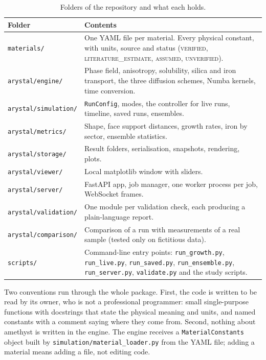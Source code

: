 \documentclass[11pt,a4paper]{article}
\newcommand{\code}[1]{\texttt{#1}}
\begin{document}
\begin{table}[ht]
\caption{Folders of the repository and what each holds.}\label{tab:folders}
\small
\begin{tabularx}{\textwidth}{@{}lX@{}}
\toprule
Folder & Contents \\
\midrule
\code{materials/} & One YAML file per material. Every physical constant, with units, source and status (\textsc{verified}, \textsc{literature\_estimate}, \textsc{assumed}, \textsc{unverified}). \\
\code{arystal/engine/} & Phase field, anisotropy, solubility, silica and iron transport, the three diffusion schemes, Numba kernels, time conversion. \\
\code{arystal/simulation/} & \code{RunConfig}, modes, the controller for live runs, timeline, saved runs, ensembles. \\
\code{arystal/metrics/} & Shape, face support distances, growth rates, iron by sector, ensemble statistics. \\
\code{arystal/storage/} & Result folders, serialisation, snapshots, rendering, plots. \\
\code{arystal/viewer/} & Local matplotlib window with sliders. \\
\code{arystal/server/} & FastAPI app, job manager, one worker process per job, WebSocket frames. \\
\code{arystal/validation/} & One module per validation check, each producing a plain-language report. \\
\code{arystal/comparison/} & Comparison of a run with measurements of a real sample (tested only on fictitious data). \\
\code{scripts/} & Command-line entry points: \code{run\_growth.py}, \code{run\_live.py}, \code{run\_saved.py}, \code{run\_ensemble.py}, \code{run\_server.py}, \code{validate.py} and the study scripts. \\
\bottomrule
\end{tabularx}
\end{table}

Two conventions run through the whole package. First, the code is written to be read by its owner, who is not a professional programmer: small single-purpose functions with docstrings that state the physical meaning and units, and named constants with a comment saying where they come from. Second, nothing about amethyst is written in the engine. The engine receives a \code{MaterialConstants} object built by \code{simulation/material\_loader.py} from the YAML file; adding a material means adding a file, not editing code.
\end{document}
